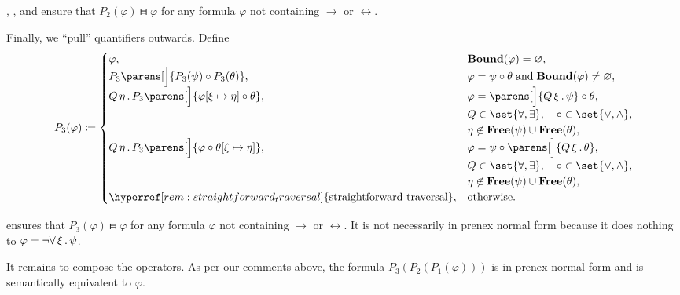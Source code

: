 \begin{algorithm}
\begin{thmenum}
    , ,  and  ensure that \( P_2(\varphi) \gleichstark \varphi \) for any formula \( \varphi \)  not containing \( \rightarrow \) or \( \leftrightarrow \).

     Finally, we \enquote{pull} quantifiers outwards. Define
    \begin{equation*}
      P_3(\varphi) \coloneqq \begin{cases}
        \varphi,                                                                           &\boldop{Bound}(\varphi) = \varnothing, \\
        P_3\parens[\Big]{ P_3(\psi) \bincirc P_3(\theta) },                                &\varphi = \psi \bincirc \theta \T{and} \boldop{Bound}(\varphi) \neq \varnothing, \\
        \quantifier Q \eta P_3 \parens[\Big]{ \varphi[\xi \mapsto \eta] \bincirc \theta }, &\varphi = \parens[\Big]{ \quantifier Q \xi \psi } \bincirc \theta, \\
                                                                                           &Q \in \set{ \forall, \exists }, \quad \bincirc \in \set{ \vee, \wedge }, \\
                                                                                           &\eta \not\in \boldop{Free}(\psi) \cup \boldop{Free}(\theta), \\
        \quantifier Q \eta P_3 \parens[\Big]{ \varphi \bincirc \theta[\xi \mapsto \eta] }, &\varphi = \psi \bincirc \parens[\Big]{ \quantifier Q \xi \theta }, \\
                                                                                           &Q \in \set{ \forall, \exists }, \quad \bincirc \in \set{ \vee, \wedge }, \\
                                                                                           &\eta \not\in \boldop{Free}(\psi) \cup \boldop{Free}(\theta), \\
        \hyperref[rem:straightforward_traversal]{\T{straightforward traversal}},           &\T{otherwise.}
      \end{cases}
    \end{equation*}

     ensures that \( P_3(\varphi) \gleichstark \varphi \) for any formula \( \varphi \) not containing \( \rightarrow \) or \( \leftrightarrow \). It is not necessarily in prenex normal form because it does nothing to \( \varphi = \neg \forall \thinspace \xi \thinspace . \thinspace \psi \).
  \end{thmenum}

  It remains to compose the operators. As per our comments above, the formula \( P_3(P_2(P_1(\varphi))) \) is in prenex normal form and is semantically equivalent to \( \varphi \).
\end{algorithm}
